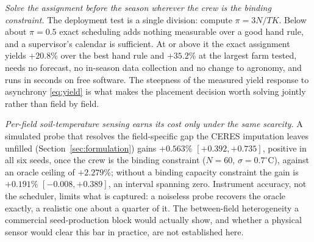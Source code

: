 \documentclass[10pt,twocolumn]{article}
\begin{document}
\emph{Solve the assignment before the season wherever the crew is the
binding constraint.} The deployment test is a single division: compute
$\pi = 3N/TK$. Below about $\pi = 0.5$ exact scheduling adds nothing
measurable over a good hand rule, and a supervisor's calendar is sufficient.
At or above it the exact assignment yields $+20.8$\% over the best hand rule
and $+35.2$\% at the largest farm tested, needs no forecast, no in-season
data collection and no change to agronomy, and runs in seconds on free
software. The steepness of the measured yield response to asynchrony
\eqref{eq:yield} is what makes the placement decision worth solving jointly
rather than field by field.

\emph{Per-field soil-temperature sensing earns its cost only under the same
scarcity.} A simulated probe that resolves the field-specific gap the CERES
imputation leaves unfilled (Section~\ref{sec:formulation}) gains $+0.563$\%
$[+0.392,+0.735]$, positive in all six seeds, once the crew is the binding
constraint ($N=60$, $\sigma=0.7^\circ$C), against an oracle ceiling of
$+2.279$\%; without a binding capacity constraint the gain is $+0.191$\%
$[-0.008,+0.389]$, an interval spanning zero. Instrument accuracy, not the
scheduler, limits what is captured: a noiseless probe recovers the oracle
exactly, a realistic one about a quarter of it. The between-field
heterogeneity a commercial seed-production block would actually show, and
whether a physical sensor would clear this bar in practice, are not
established here.
\end{document}
